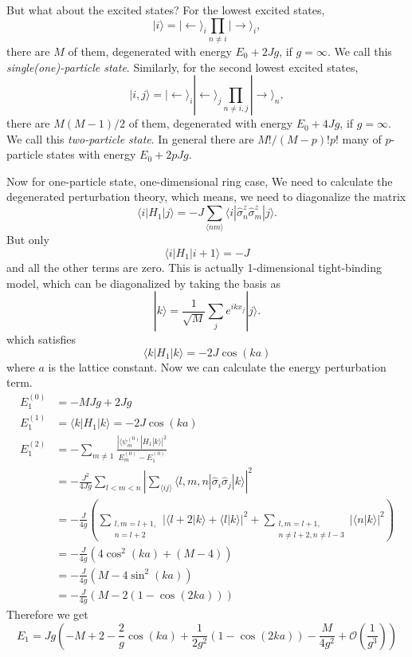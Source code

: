But what about the excited states? For the lowest excited states,
\begin{equation}
|i\rangle =|\leftarrow \rangle_i\prod_{n\neq i}|\rightarrow\rangle_i,
\end{equation}
there are $M$ of them, degenerated with energy $E_0+2Jg$, if $g=\infty$. We call this \textit{single(one)-particle state}. Similarly, for the second lowest excited states,
\begin{equation}
|i,j\rangle=|\leftarrow\rangle_i |\leftarrow\rangle_j\prod_{n\neq i,j}|\rightarrow\rangle_n,
\end{equation}
there are $M(M-1)/2$ of them, degenerated with energy $E_0+4Jg$, if $g=\infty$. We call this \textit{two-particle state}. In general there are $M!/(M-p)!p!$ many of $p$-particle states with energy $E_0+2pJg$.

Now for one-particle state, one-dimensional ring case, We need to calculate the degenerated perturbation theory, which means, we need to diagonalize the matrix
\begin{equation}
\langle i|H_1|j\rangle=-J\sum_{\langle nm\rangle}\langle i|\hat{\sigma}_n^z\hat{\sigma}_m^z|j\rangle.
\end{equation}
But only
\begin{equation}
\langle i|H_1|i+1\rangle=-J
\end{equation}
and all the other terms are zero. This is actually 1-dimensional tight-binding model, which can be diagonalized by taking the basis as
\begin{equation}
|k\rangle=\frac{1}{\sqrt{M}}\sum_{j}e^{ikx_j}|j\rangle.
\end{equation}
which satisfies
\begin{equation}
\langle k |H_1|k\rangle =-2J\cos (ka) 
\end{equation}
where $a$ is the lattice constant.
Now we can calculate the energy perturbation term.
\begin{align*}
E_1^{(0)}&=-MJg+2Jg\\
E_1^{(1)}&=\langle k|H_1|k\rangle = -2J\cos(ka)\\
E_1^{(2)}&=-\sum_{m\neq 1}\frac{|\langle \psi_m^{(0)}|H_1|k\rangle|^2}{E_m^{(0)}-E_1^{(0)}}\\
&=-\frac{J^2}{4Jg}\sum_{l<m<n}\left|\sum_{\langle ij\rangle}\langle l,m,n|\hat{\sigma}_i\hat{\sigma}_{j}|k\rangle\right|^2\\
&=-\frac{J}{4g}\left(\sum_{\substack{l,m=l+1,\\n=l+2}}\left|\langle l+2|k\rangle+\langle l|k\rangle\right|^2+\sum_{\substack{l,m=l+1,\\n\neq l+2, n\neq l-3}}|\langle n|k\rangle|^2\right)\\
&=-\frac{J}{4g}\left(4\cos^2(ka)+(M-4)\right)\\
&=-\frac{J}{4g}\left(M-4\sin^2(ka)\right)\\
&=-\frac{J}{4g}\left(M-2\left(1-\cos(2ka)\right)\right)
\end{align*}
Therefore we get
\begin{equation}
E_1=Jg\left(-M+2-\frac{2}{g}\cos(ka)+\frac{1}{2g^2}(1-\cos(2ka))-\frac{M}{4g^2}+\mathcal{O}\left(\frac{1}{g^3}\right)\right)
\end{equation}

